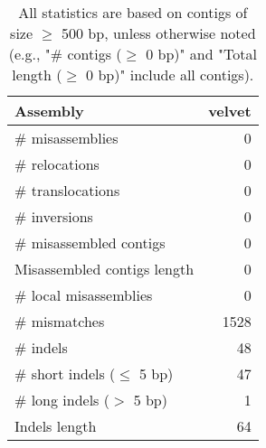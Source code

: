 \documentclass[12pt,a4paper]{article}
\begin{document}
\begin{table}[ht]
\begin{center}
\caption{All statistics are based on contigs of size $\geq$ 500 bp, unless otherwise noted (e.g., "\# contigs ($\geq$ 0 bp)" and "Total length ($\geq$ 0 bp)" include all contigs).}
\begin{tabular}{|l*{1}{|r}|}
\hline
Assembly & velvet \\ \hline
\# misassemblies & 0 \\ \hline
\hspace{5mm}\# relocations & 0 \\ \hline
\hspace{5mm}\# translocations & 0 \\ \hline
\hspace{5mm}\# inversions & 0 \\ \hline
\# misassembled contigs & 0 \\ \hline
Misassembled contigs length & 0 \\ \hline
\# local misassemblies & 0 \\ \hline
\# mismatches & 1528 \\ \hline
\# indels & 48 \\ \hline
\hspace{5mm}\# short indels ($\leq$ 5 bp) & 47 \\ \hline
\hspace{5mm}\# long indels ($>$ 5 bp) & 1 \\ \hline
Indels length & 64 \\ \hline
\end{tabular}
\end{center}
\end{table}
\end{document}
